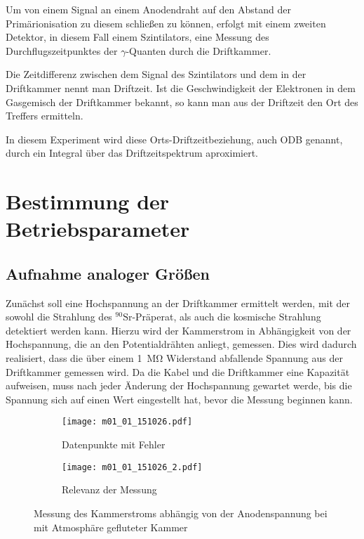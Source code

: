 \documentclass[11pt, ngerman, fleqn, DIV=15, headinclude, BCOR=2cm]{scrreprt}
\begin{document}
Um von einem Signal an einem Anodendraht auf den Abstand der Primärionisation
zu diesem schließen zu können, erfolgt mit einem zweiten Detektor, in diesem
Fall einem Szintilators, eine Messung des Durchflugszeitpunktes der
$\gamma$-Quanten durch die Driftkammer.

Die Zeitdifferenz zwischen dem Signal des Szintilators und dem in der
Driftkammer nennt man Driftzeit. Ist die Geschwindigkeit der Elektronen in dem
Gasgemisch der Driftkammer bekannt, so kann man aus der Driftzeit den Ort
des Treffers ermitteln.

In diesem Experiment wird diese Orts-Driftzeitbeziehung, auch ODB genannt,
durch ein Integral über das Driftzeitspektrum aproximiert.



\chapter{Bestimmung der Betriebsparameter}

\section{Aufnahme analoger Größen}
Zunächst soll eine Hochspannung an der Driftkammer ermittelt werden, mit 
der sowohl die
Strahlung des $ ^{90}\text{Sr}$-Präperat, als auch die kosmische Strahlung
detektiert werden kann.
Hierzu wird der Kammerstrom  in Abhängigkeit von der Hochspannung, die an den
Potentialdrähten anliegt, gemessen. 
Dies wird dadurch realisiert, dass die über einem \SI{1}{\mega\ohm} Widerstand
abfallende  Spannung aus der Driftkammer gemessen wird.
Da die Kabel und die Driftkammer eine Kapazität aufweisen, muss nach jeder Änderung der
Hochspannung gewartet werde, bis die Spannung sich auf einen Wert eingestellt
hat, bevor die Messung beginnen kann.

\begin{figure}
	\begin{subfigure}{0.49 \linewidth}
        \centering
        \texttt{[image: m01\_01\_151026.pdf]}
        \caption{%
		Datenpunkte mit Fehler
       }
        \label{fig:m01_01_messdaten}
    \end{subfigure}
    \begin{subfigure}{0.49 \linewidth}
        \centering
        \texttt{[image: m01\_01\_151026\_2.pdf]}
        \caption{%
		Relevanz der Messung
	}
        \label{fig:m01_01_relevanz}
    \end{subfigure}
    \caption{%
	    Messung des Kammerstroms abhängig von der Anodenspannung bei mit
	    Atmosphäre gefluteter Kammer
    }
    \label{fig:m01_01_plots}
\end{figure}
\end{document}
